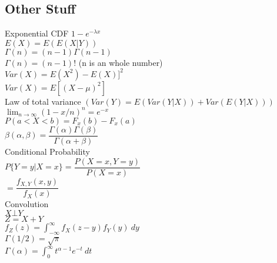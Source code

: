 \documentclass{article}
\newcommand{\B}{\beta}
\begin{document}
\begin{flushleft}
\section*{Other Stuff}
Exponential CDF $1-e^{-\lambda x}$\\
$E(X) = E(E(X|Y))$\\
$\Gamma(n) = (n-1)\Gamma(n-1)$\\
$\Gamma(n)=(n-1)!$ (n is an whole number)\\
$Var(X) = E(X^2) - E(X)]^2$\\
$Var(X) = E[(X - \mu)^2]$\\
Law of total variance $(Var(Y) = E(Var(Y|X)) + Var(E(Y|X)))$\\
$\lim_{n\to \infty } (1-x/n)^n=e^{-x}$\\
$P(a < X < b) = F_x(b) - F_x(a)$\\
$\B(\alpha,\B)=\dfrac{\Gamma(\alpha)\Gamma(\B)}{\Gamma(\alpha+\B)}$\\
Conditional Probability\\
$P\{Y=y|X=x\}=\dfrac{P(X=x,Y=y)}{P(X=x)}$\\
$=\dfrac{f_{X,Y}(x,y)}{f_X(x)}$\\
Convolution\\
$X\bot Y$\\
$Z=X+Y$\\
$f_Z(z)=\int_{-\infty}^{\infty}f_X(z-y)f_Y(y) \ dy$\\
$\Gamma(1/2)=\sqrt{\pi}$\\
$\Gamma(\alpha)=\int_{0}^{\infty}t^{\alpha-1}e^{-t} \ dt$\\
\end{flushleft}
\end{document}
